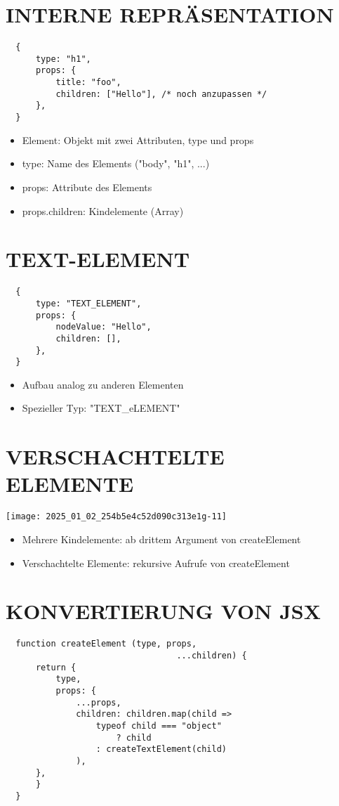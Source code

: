   \section*{INTERNE REPRÄSENTATION}
  \begin{verbatim}
  {
      type: "h1",
      props: {
          title: "foo",
          children: ["Hello"], /* noch anzupassen */
      },
  }
  \end{verbatim}
  
  \begin{itemize}
    \item Element: Objekt mit zwei Attributen, type und props
    \item type: Name des Elements ("body", "h1", ...)
    \item props: Attribute des Elements
    \item props.children: Kindelemente (Array)
  \end{itemize}
  
  \section*{TEXT-ELEMENT}
  \begin{verbatim}
  {
      type: "TEXT_ELEMENT",
      props: {
          nodeValue: "Hello",
          children: [],
      },
  }
  \end{verbatim}
  
  \begin{itemize}
    \item Aufbau analog zu anderen Elementen
    \item Spezieller Typ: "TEXT\_eLEMENT"
  \end{itemize}
  
  \section*{VERSCHACHTELTE ELEMENTE}
  \begin{center}
  \texttt{[image: 2025\_01\_02\_254b5e4c52d090c313e1g-11]}
  \end{center}
  
  \begin{itemize}
    \item Mehrere Kindelemente: ab drittem Argument von createElement
    \item Verschachtelte Elemente: rekursive Aufrufe von createElement
  \end{itemize}
  
  \section*{KONVERTIERUNG VON JSX}
  \begin{verbatim}
  function createElement (type, props,
                                  ...children) {
      return {
          type,
          props: {
              ...props,
              children: children.map(child =>
                  typeof child === "object"
                      ? child
                  : createTextElement(child)
              ),
      },
      }
  }
  \end{verbatim}
  
